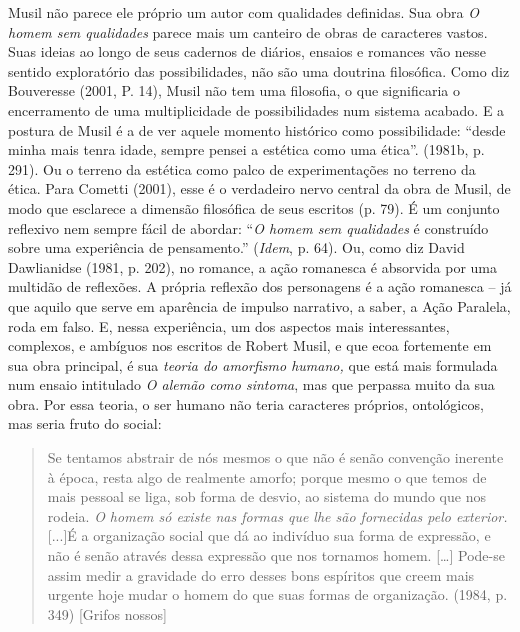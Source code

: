 Musil não parece ele próprio um autor com qualidades definidas. Sua obra
\emph{O homem sem qualidades} parece mais um canteiro de obras de
caracteres vastos. Suas ideias ao longo de seus cadernos de diários,
ensaios e romances vão nesse sentido exploratório das possibilidades,
não são uma doutrina filosófica. Como diz Bouveresse (2001, P. 14),
Musil não tem uma filosofia, o que significaria o encerramento de uma
multiplicidade de possibilidades num sistema acabado. E a postura de
Musil é a de ver aquele momento histórico como possibilidade: ``desde
minha mais tenra idade, sempre pensei a estética como uma ética''.
(1981b, p. 291). Ou o terreno da estética como palco de experimentações
no terreno da ética. Para Cometti (2001), esse é o verdadeiro nervo
central da obra de Musil, de modo que esclarece a dimensão filosófica de
seus escritos (p. 79). É um conjunto reflexivo nem sempre fácil de
abordar: ``\emph{O homem sem qualidades} é construído sobre uma
experiência de pensamento.'' (\emph{Idem}, p. 64). Ou, como diz David
Dawlianidse (1981, p. 202), no romance, a ação romanesca é absorvida por
uma multidão de reflexões. A própria reflexão dos personagens é a ação
romanesca -- já que aquilo que serve em aparência de impulso narrativo,
a saber, a Ação Paralela, roda em falso. E, nessa experiência, um dos
aspectos mais interessantes, complexos, e ambíguos nos escritos de
Robert Musil, e que ecoa fortemente em sua obra principal, é sua
\emph{teoria do amorfismo humano,} que está mais formulada num ensaio
intitulado \emph{O alemão como sintoma}, mas que perpassa muito da sua
obra. Por essa teoria, o ser humano não teria caracteres próprios,
ontológicos, mas seria fruto do social:

\begin{quote}
Se tentamos abstrair de nós mesmos o que não é senão convenção inerente
à época, resta algo de realmente amorfo; porque mesmo o que temos de
mais pessoal se liga, sob forma de desvio, ao sistema do mundo que nos
rodeia. \emph{O homem só existe nas formas que lhe são fornecidas pelo
exterior.} {[}...{]}É a organização social que dá ao indivíduo sua forma
de expressão, e não é senão através dessa expressão que nos tornamos
homem. {[}\ldots{}{]} Pode-se assim medir a gravidade do erro desses
bons espíritos que creem mais urgente hoje mudar o homem do que suas
formas de organização. (1984, p. 349) {[}Grifos nossos{]}
\end{quote}

